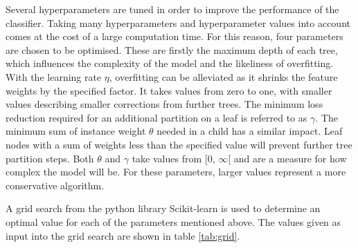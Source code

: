 Several hyperparameters are tuned in order to improve the performance of the classifier.
Taking many hyperparameters and hyperparameter values into account comes at the
cost of a large computation time. For this reason, four parameters are chosen to be optimised. These are firstly the maximum depth of each tree, which influences the
complexity of the model and the likeliness of overfitting. With the learning rate $\eta$, overfitting can be alleviated as it shrinks the feature weights
by the specified factor. It takes values from zero to one, with smaller values describing smaller corrections from further trees.
The minimum loss reduction required for an additional partition on a leaf is referred to as $\gamma$. The minimum sum of instance weight $\theta$
needed in a child has a similar impact. Leaf nodes with a sum of weights less than the specified value will prevent further tree partition steps.
Both $\theta$ and $\gamma$ take values from [0, $\infty$[ and are a measure for how complex the model will be.
For these parameters, larger values represent a more
conservative algorithm.

A grid search from the python \cite{python} library Scikit-learn \cite{scikit} is used to determine an optimal
value for each of the parameters mentioned above. The values given as input into the grid search
are shown in table \ref{tab:grid}.

